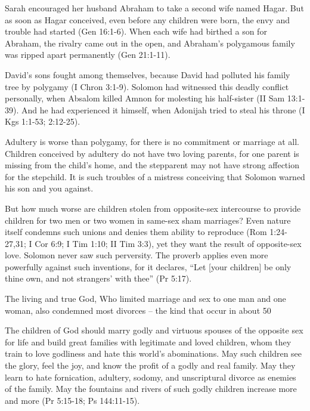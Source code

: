 Sarah encouraged her husband Abraham to take a second wife named Hagar. But as soon as Hagar conceived, even before any children were born, the envy and trouble had started (Gen 16:1-6). When each wife had birthed a son for Abraham, the rivalry came out in the open, and Abraham’s polygamous family was ripped apart permanently (Gen 21:1-11).

David’s sons fought among themselves, because David had polluted his family tree by polygamy (I Chron 3:1-9). Solomon had witnessed this deadly conflict personally, when Absalom killed Amnon for molesting his half-sister (II Sam 13:1-39). And he had experienced it himself, when Adonijah tried to steal his throne (I Kgs 1:1-53; 2:12-25).

Adultery is worse than polygamy, for there is no commitment or marriage at all. Children conceived by adultery do not have two loving parents, for one parent is missing from the child’s home, and the stepparent may not have strong affection for the stepchild. It is such troubles of a mistress conceiving that Solomon warned his son and you against.

But how much worse are children stolen from opposite-sex intercourse to provide children for two men or two women in same-sex sham marriages? Even nature itself condemns such unions and denies them ability to reproduce (Rom 1:24-27,31; I Cor 6:9; I Tim 1:10; II Tim 3:3), yet they want the result of opposite-sex love. Solomon never saw such perversity. The proverb applies even more powerfully against such inventions, for it declares, “Let [your children] be only thine own, and not strangers’ with thee” (Pr 5:17).

The living and true God, Who limited marriage and sex to one man and one woman, also condemned most divorces – the kind that occur in about 50%

The children of God should marry godly and virtuous spouses of the opposite sex for life and build great families with legitimate and loved children, whom they train to love godliness and hate this world’s abominations. May such children see the glory, feel the joy, and know the profit of a godly and real family. May they learn to hate fornication, adultery, sodomy, and unscriptural divorce as enemies of the family. May the fountains and rivers of such godly children increase more and more (Pr 5:15-18; Ps 144:11-15).

